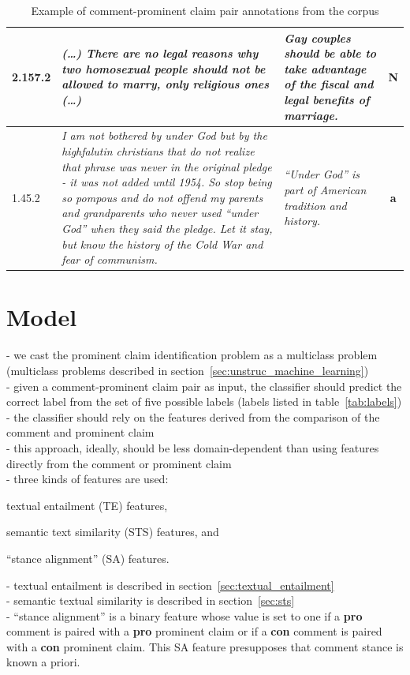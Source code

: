 \begin{table}[t]
{\begin{tabular}{@{}lp{9.5cm}p{3.5cm}c@{}}
\midrule
2.157.2 & \normalsize{%
\textit{
(\dots) There are no legal reasons why two homosexual people should not be
allowed to marry, only religious ones (\dots)
}
} & \normalsize{%
\textit{
Gay couples should be able to take advantage of the fiscal and legal benefits
of marriage.
}
} & \textbf{N} \\
\midrule
1.45.2 & \normalsize{%
\textit{
 I am not bothered by under God but by the highfalutin christians that do not
 realize that phrase was never in the original pledge - it was not added until
 1954. So stop being so pompous and do not offend my parents and grandparents
 who never used ``under God'' when they said the pledge. Let it stay, but know
 the history of the Cold War and fear of communism.
 }} & 
 \normalsize{
 \textit{
 ``Under God'' is part of American tradition and history.
 }} & \textbf{a}  \\
\bottomrule
\end{tabular}
}
\caption{Example of comment-prominent claim pair annotations from the \ComArg corpus}
\label{tab:comarg}
\end{table}


\section{Model}

- we cast the prominent claim identification problem as a multiclass problem
(multiclass problems described in section~\ref{sec:unstruc_machine_learning}) \\
- given a comment-prominent claim pair as input, the classifier should
predict the correct label from the set of five possible labels (labels
listed in table~\ref{tab:labels}) \\
- the classifier should rely on the features derived from the comparison
of the comment and prominent claim \\
- this approach, ideally, should be less domain-dependent than using features
directly from the comment or prominent claim \\
- three kinds of features are used: \begin{enumerate*}
\item textual entailment (TE) features, 
\item semantic text similarity (STS) features, and
\item ``stance alignment'' (SA) features. 
\end{enumerate*}
- textual entailment is described in section~\ref{sec:textual_entailment} \\
- semantic textual similarity is described in section~\ref{sec:sts} \\
- ``stance alignment'' is a binary feature whose value is set to one if a
\textbf{pro} comment is paired with a \textbf{pro} prominent claim or if a
\textbf{con} comment is paired with a \textbf{con} prominent claim.  This SA
feature presupposes that comment stance is known a priori. \\

